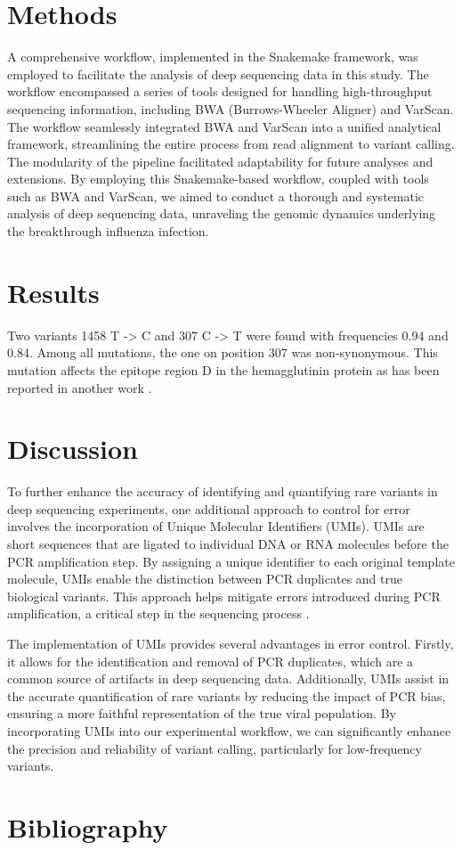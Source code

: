 \documentclass{scrartcl}
\begin{document}
\section{Methods}
A comprehensive workflow, implemented in the Snakemake framework, was employed to facilitate the analysis of deep sequencing data in this study. The workflow encompassed a series of tools designed for handling high-throughput sequencing information, including BWA (Burrows-Wheeler Aligner) and VarScan.
The workflow seamlessly integrated BWA and VarScan into a unified analytical framework, streamlining the entire process from read alignment to variant calling.
The modularity of the pipeline facilitated adaptability for future analyses and extensions.
By employing this Snakemake-based workflow, coupled with tools such as BWA and VarScan, we aimed to conduct a thorough and systematic analysis of deep sequencing data, unraveling the genomic dynamics underlying the breakthrough influenza infection.

\section{Results}
Two variants 1458 T -> C	and 307 C -> T were found with frequencies 0.94 and 0.84. Among all mutations, the one on position 307 was non-synonymous. This mutation affects the epitope region D in the hemagglutinin protein as has been reported in another work \cite{munoz_epitope_2005}.

\section{Discussion}
To further enhance the accuracy of identifying and quantifying rare variants in deep sequencing experiments, one additional approach to control for error involves the incorporation of Unique Molecular Identifiers (UMIs). UMIs are short sequences that are ligated to individual DNA or RNA molecules before the PCR amplification step. By assigning a unique identifier to each original template molecule, UMIs enable the distinction between PCR duplicates and true biological variants. This approach helps mitigate errors introduced during PCR amplification, a critical step in the sequencing process \cite{smith_umi-tools_2017}.

The implementation of UMIs provides several advantages in error control. Firstly, it allows for the identification and removal of PCR duplicates, which are a common source of artifacts in deep sequencing data. Additionally, UMIs assist in the accurate quantification of rare variants by reducing the impact of PCR bias, ensuring a more faithful representation of the true viral population. By incorporating UMIs into our experimental workflow, we can significantly enhance the precision and reliability of variant calling, particularly for low-frequency variants.

\newpage
\section{Bibliography}


\end{document}
